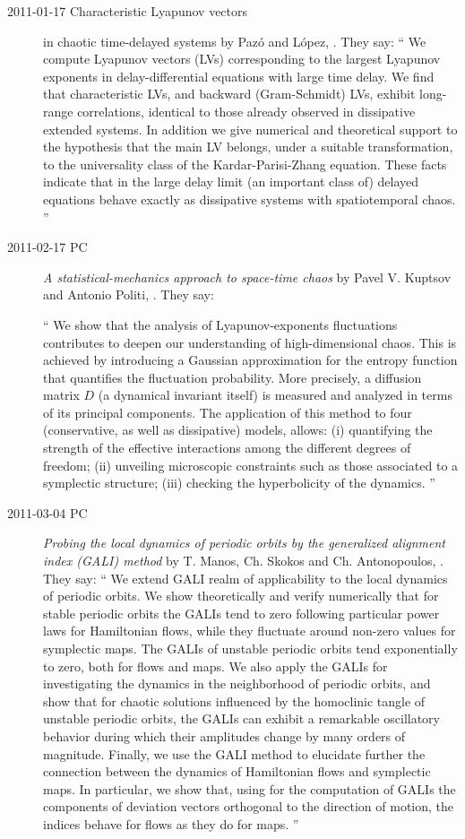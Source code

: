 \begin{description}
\item[2011-01-17 Characteristic {Lyapunov} vectors]
in chaotic time-delayed systems
by Paz{\'o} and L{\'o}pez,
. They say:
``
We compute Lyapunov vectors (LVs) corresponding to the largest Lyapunov
exponents in delay-differential equations with large time delay. We find
that characteristic LVs, and backward (Gram-Schmidt) LVs, exhibit
long-range correlations, identical to those already observed in
dissipative extended systems. In addition we give numerical and
theoretical support to the hypothesis that the main LV belongs, under a
suitable transformation, to the universality class of the
Kardar-Parisi-Zhang equation. These facts indicate that in the large
delay limit (an important class of) delayed equations behave exactly as
dissipative systems with spatiotemporal chaos.
''
\item[2011-02-17 PC]
\emph{A statistical-mechanics approach to space-time chaos}
by  Pavel V. Kuptsov and Antonio Politi,
. They say:

``
We show that the analysis of Lyapunov-exponents fluctuations
contributes to deepen our understanding of high-dimensional chaos. This is
achieved by introducing a Gaussian approximation for the entropy function that
quantifies the fluctuation probability. More precisely, a diffusion matrix $D$ (a
dynamical invariant itself) is measured and analyzed in terms of its principal
components. The application of this method to four (conservative, as well as
dissipative) models, allows: (i) quantifying the strength of the effective
interactions among the different degrees of freedom; (ii) unveiling microscopic
constraints such as those associated to a symplectic structure; (iii) checking
the hyperbolicity of the dynamics.
''

\item[2011-03-04 PC]
\emph{Probing the local dynamics of periodic orbits by
      the generalized alignment index (GALI) method}
by T. Manos, Ch. Skokos and  Ch. Antonopoulos,
. They say:
``
We extend GALI realm of applicability to the
local dynamics of periodic orbits. We show theoretically and verify
numerically that for stable periodic orbits the GALIs tend to zero
following particular power laws for Hamiltonian flows, while they
fluctuate around non-zero values for symplectic maps. The
GALIs of unstable periodic orbits tend exponentially to zero, both for
flows and maps. We also apply the GALIs for investigating the dynamics in
the neighborhood of periodic orbits, and show that for chaotic solutions
influenced by the homoclinic tangle of unstable periodic orbits, the
GALIs can exhibit a remarkable oscillatory behavior during which their
amplitudes change by many orders of magnitude. Finally, we use the GALI
method to elucidate further the connection between the dynamics of
Hamiltonian flows and symplectic maps. In particular, we show that, using
for the computation of GALIs the components of deviation vectors
orthogonal to the direction of motion, the indices behave for flows as
they do for maps.
''


\end{description}
